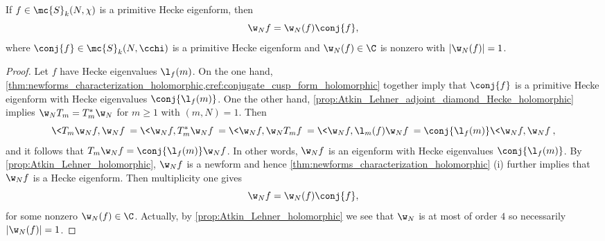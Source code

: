     \begin{proposition}\label{prop:Atkin_Lehner_conjugation_holomorphic}
      If $f \in \mc{S}_{k}(N,\chi)$ is a primitive Hecke eigenform, then
      \[
        \w_{N}f = \w_{N}(f)\conj{f},
      \]
      where $\conj{f} \in \mc{S}_{k}(N,\cchi)$ is a primitive Hecke eigenform and $\w_{N}(f) \in \C$ is nonzero with $|\w_{N}(f)| = 1$.
    \end{proposition}
    \begin{proof}
      Let $f$ have Hecke eigenvalues $\l_{f}(m)$. On the one hand, \cref{thm:newforms_characterization_holomorphic,cref:conjugate_cusp_form_holomorphic} together imply that $\conj{f}$ is a primitive Hecke eigenform with Hecke eigenvalues $\conj{\l_{f}(m)}$. One the other hand, \cref{prop:Atkin_Lehner_adjoint_diamond_Hecke_holomorphic} implies $\w_{N}T_{m} = T_{m}^{\ast}\w_{N}$ for $m \ge 1$ with $(m,N) = 1$. Then
      \[
        \<T_{m}\w_{N}f,\w_{N}f\> = \<\w_{N}f,T_{m}^{\ast}\w_{N}f\> = \<\w_{N}f,\w_{N}T_{m}f\> = \<\w_{N}f,\l_{m}(f)\w_{N}f\> = \conj{\l_{f}(m)}\<\w_{N}f,\w_{N}f\>,
      \]
      and it follows that $T_{m}\w_{N}f = \conj{\l_{f}(m)}\w_{N}f$. In other words, $\w_{N}f$ is an eigenform with Hecke eigenvalues $\conj{\l_{f}(m)}$. By \cref{prop:Atkin_Lehner_holomorphic}, $\w_{N}f$ is a newform and hence \cref{thm:newforms_characterization_holomorphic} (i) further implies that $\w_{N}f$ is a Hecke eigenform. Then multiplicity one gives
      \[
        \w_{N}f = \w_{N}(f)\conj{f},
      \]
      for some nonzero $\w_{N}(f) \in \C$. Actually, by \cref{prop:Atkin_Lehner_holomorphic} we see that $\w_{N}$ is at most of order $4$ so necessarily $|\w_{N}(f)| = 1$.
    \end{proof} 
